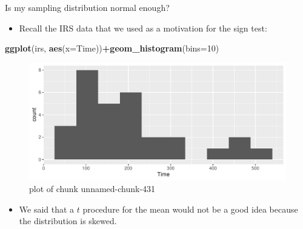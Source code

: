 \documentclass[
  ignorenonframetext,
]{beamer}
\newenvironment{Shaded}{\begin{snugshade}}{\end{snugshade}}
\newcommand{\DataTypeTok}[1]{\textcolor[rgb]{0.13,0.29,0.53}{#1}}
\newcommand{\DecValTok}[1]{\textcolor[rgb]{0.00,0.00,0.81}{#1}}
\newcommand{\KeywordTok}[1]{\textcolor[rgb]{0.13,0.29,0.53}{\textbf{#1}}}
\newcommand{\NormalTok}[1]{#1}
\newcommand{\OperatorTok}[1]{\textcolor[rgb]{0.81,0.36,0.00}{\textbf{#1}}}
\providecommand{\tightlist}{%
  \setlength{\itemsep}{0pt}\setlength{\parskip}{0pt}}
\begin{document}
\begin{frame}[fragile]{Is my sampling distribution normal enough?}
\protect\hypertarget{is-my-sampling-distribution-normal-enough}{}

\begin{itemize}
\tightlist
\item
  Recall the IRS data that we used as a motivation for the sign test:
\end{itemize}

\begin{Shaded}
\begin{Highlighting}[]
\KeywordTok{ggplot}\NormalTok{(irs, }\KeywordTok{aes}\NormalTok{(}\DataTypeTok{x=}\NormalTok{Time))}\OperatorTok{+}\KeywordTok{geom_histogram}\NormalTok{(}\DataTypeTok{bins=}\DecValTok{10}\NormalTok{)}
\end{Highlighting}
\end{Shaded}

\begin{figure}
\centering
\includegraphics{figure/unnamed-chunk-431-1.pdf}
\caption{plot of chunk unnamed-chunk-431}
\end{figure}

\begin{itemize}
\tightlist
\item
  We said that a \(t\) procedure for the mean would not be a good idea
  because the distribution is skewed.
\end{itemize}

\end{frame}
\end{document}
